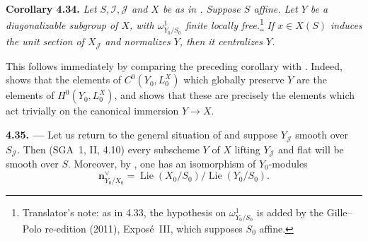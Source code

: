\medskip
\noindent{}\textbf{Corollary 4.34.}
\textit{Let \(S,\mathscr I,\mathscr J\) and \(X\) be as in . Suppose
\(S\) affine. Let \(Y\) be a diagonalizable subgroup of \(X\), with
\(\omega^1_{Y_0/S_0}\) finite locally free.}\footnote{Translator's note: as in
4.33, the hypothesis on \(\omega^1_{Y_0/S_0}\) is added by the Gille--Polo
re-edition (2011), Exposé~III, which supposes \(S_0\) affine.} \textit{If
\(x\in X(S)\) induces the unit section of \(X_{\mathscr J}\) and
normalizes \(Y\), then it centralizes \(Y\).}

This follows immediately by comparing the preceding corollary with
. Indeed,  shows that the elements of \(C^0(Y_0,L_0^X)\)
which globally preserve \(Y\) are the elements of
\(H^0(Y_0,L_0^X)\), and  shows that these are precisely the
elements which act trivially on the canonical immersion
\(Y\longrightarrow X\).

\medskip
\noindent{}\textbf{4.35. ---}
Let us return to the general situation of  and suppose
\(Y_{\mathscr J}\) smooth over \(S_{\mathscr J}\). Then (SGA~1, II, 4.10)
every subscheme \(Y\) of \(X\) lifting \(Y_{\mathscr J}\) and flat will be
smooth over \(S\). Moreover, by , one has an isomorphism of
\(Y_0\)-modules
\[
 \mathbf n_{Y_0/X_0}^{\vee}
 =\operatorname{Lie}(X_0/S_0)/\operatorname{Lie}(Y_0/S_0).
\]

